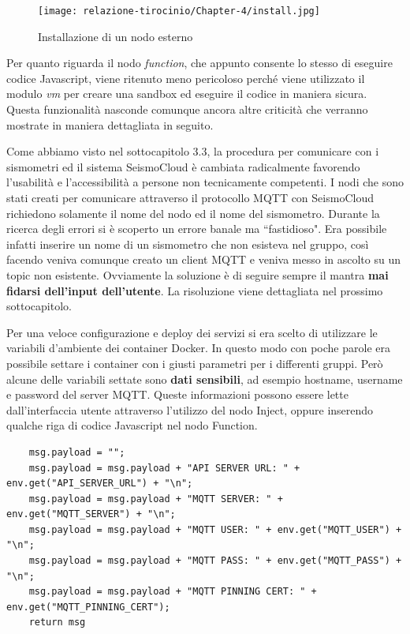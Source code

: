 \documentclass[a4paper,10pt]{memoir}
\begin{document}
\begin{figure}[ht]
    \texttt{[image: relazione-tirocinio/Chapter-4/install.jpg]}
    \caption{Installazione di un nodo esterno}
    \label{fig:install}
\end{figure}

Per quanto riguarda il nodo \textit{function}, che appunto consente lo stesso di eseguire codice Javascript, viene ritenuto meno pericoloso perché viene utilizzato il modulo \textit{vm} per creare una sandbox ed eseguire il codice in maniera sicura.
Questa funzionalità nasconde comunque ancora altre criticità che verranno mostrate in maniera dettagliata in seguito.

Come abbiamo visto nel sottocapitolo 3.3, la procedura per comunicare con i sismometri ed il sistema SeismoCloud è cambiata radicalmente favorendo l'usabilità e l'accessibilità a persone non tecnicamente competenti. I nodi che sono stati creati per comunicare attraverso il protocollo MQTT con SeismoCloud richiedono solamente il nome del nodo ed il nome del sismometro.
Durante la ricerca degli errori si è scoperto un errore banale ma ``fastidioso". Era possibile infatti inserire un nome di un sismometro che non esisteva nel gruppo, così facendo veniva comunque creato un client MQTT e veniva messo in ascolto su un topic non esistente.
Ovviamente la soluzione è di seguire sempre il mantra \textbf{mai fidarsi dell'input dell'utente}. La risoluzione viene dettagliata nel prossimo sottocapitolo.

Per una veloce configurazione e deploy dei servizi si era scelto di utilizzare le variabili d'ambiente dei container Docker. In questo modo con poche parole era possibile settare i container con i giusti parametri per i differenti gruppi.
Però alcune delle variabili settate sono \textbf{dati sensibili}, ad esempio hostname, username e password del server MQTT.
Queste informazioni possono essere lette dall'interfaccia utente attraverso l'utilizzo del nodo Inject, oppure inserendo qualche riga di codice Javascript nel nodo Function.

\begin{lstlisting}
    msg.payload = "";
    msg.payload = msg.payload + "API SERVER URL: " + env.get("API_SERVER_URL") + "\n";
    msg.payload = msg.payload + "MQTT SERVER: " + env.get("MQTT_SERVER") + "\n";
    msg.payload = msg.payload + "MQTT USER: " + env.get("MQTT_USER") + "\n";
    msg.payload = msg.payload + "MQTT PASS: " + env.get("MQTT_PASS") + "\n";
    msg.payload = msg.payload + "MQTT PINNING CERT: " + env.get("MQTT_PINNING_CERT");
    return msg
\end{lstlisting}
\end{document}
